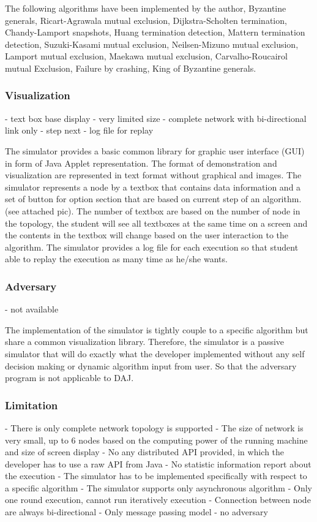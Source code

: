 The following algorithms have been implemented by the author,  Byzantine generals, Ricart-Agrawala mutual exclusion, Dijkstra-Scholten termination, Chandy-Lamport snapshots, Huang termination detection, Mattern termination detection, Suzuki-Kasami mutual exclusion, Neilsen-Mizuno mutual exclusion, Lamport mutual exclusion, Maekawa mutual exclusion, Carvalho-Roucairol mutual Exclusion, Failure by crashing, King of Byzantine generals.

\subsubsection{Visualization}
- text box base display
- very limited size
- complete network with bi-directional link only
- step next
- log file for replay

The simulator provides a basic common library for graphic user interface (GUI) in form of Java Applet representation. The format of demonstration and visualization are represented in text format without graphical and images. The simulator represents a node by a textbox that contains data information and a set of button for option section that are based on current step of an algorithm. (see attached pic). The number of textbox are based on the number of node in the topology, the student will see all textboxes at the same time on a screen and the contents in the textbox will change based on the user interaction to the algorithm. The simulator provides a log file for each execution so that student able to replay the execution as many time as he/she wants.

\subsubsection{Adversary}
- not available

The implementation of the simulator is tightly couple to a specific algorithm but share a common visualization library. Therefore, the simulator is a passive simulator that will do exactly what the developer implemented without any self decision making or dynamic algorithm input from user. So that the adversary program is not applicable to DAJ.

\subsubsection{Limitation}
- There is only complete network topology is supported
- The size of network is very small, up to 6 nodes based on the computing power of the running machine and size of screen display
- No any distributed API provided, in which the developer has to use a raw API from Java
- No statistic information report about the execution
- The simulator has to be implemented specifically with respect to a specific algorithm
- The simulator supports only asynchronous algorithm
- Only one round execution, cannot run iteratively execution
- Connection between node are always bi-directional
- Only message passing model
- no adversary











